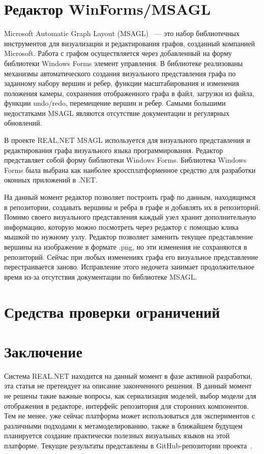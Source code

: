 \documentclass{spisok-article}
\begin{document}
\section{Редактор WinForms/MSAGL}

Microsoft Automatic Graph Layout (MSAGL)~\cite{pupyrev2010bundling} --- это набор библиотечных инструментов для визуализации и редактирования графов, созданный компанией Microsoft. Работа с графом осуществляется через добавленный на форму библиотеки Windows Forms элемент управления. В библиотеке реализованы механизмы автоматического создания визуального представления графа по заданному набору вершин и ребер, функции масштабирования и изменения положения камеры, сохранения отображенного графа в файл, загрузки из файла, функции undo/redo, перемещение вершин и ребер. Самыми большими недостатками MSAGL являются отсутствие документации и регулярных обновлений.

В проекте REAL.NET MSAGL используется для визуального представления и редактирования графа визуального языка программирования. Редактор представляет собой форму библиотеки Windows Forms. Библиотека Windows Forms была выбрана как наиболее кроссплатформенное средство для разработки оконных приложений в .NET.

На данный момент редактор позволяет построить граф по данным, находящимся в репозитории, создавать вершины и ребра в графе и добавлять их в репозиторий. Помимо своего визуального представления каждый узел хранит дополнительную информацию, которую можно посмотреть через редактор с помощью клика мышкой по нужному узлу. Редактор позволяет заменить текущее представление вершины на изображение в формате .png, но эти изменения не сохраняются в репозиторий. Сейчас при любых изменениях графа его визуальное представление перестраивается заново. Исправление этого недочета занимает продолжительное время из-за отсутствия документации по библиотеке MSAGL.

\section{Средства проверки ограничений}

\section{Заключение}

Система REAL.NET находится на данный момент в фазе активной разработки, эта статья не претендует на описание законченного решения. В данный момент не решены такие важные вопросы, как сериализация моделей, выбор модели для отображения в редакторе, интерфейс репозитория для сторонних компонентов. Тем не менее, уже сейчас платформа может использоваться для экспериментов с различными подходами к  метамоделированию, также в ближайшем будущем планируется создание практически полезных визуальных языков на этой платформе. Текущие результаты представлены в GitHub-репозитории проекта~\cite{realNetGithub}.
\end{document}
